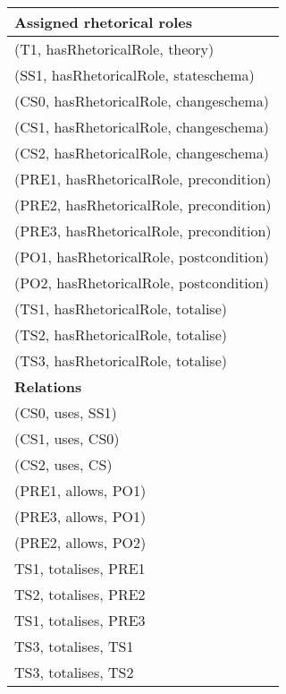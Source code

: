 \documentclass{article}
\begin{document}
\begin{tabular}{|l|}
\hline
\textbf{Assigned rhetorical roles}\\
\hline
(T1, hasRhetoricalRole, theory) \\
(SS1, hasRhetoricalRole, stateschema) \\
(CS0, hasRhetoricalRole, changeschema) \\
(CS1, hasRhetoricalRole, changeschema) \\
(CS2, hasRhetoricalRole, changeschema) \\
(PRE1, hasRhetoricalRole, precondition) \\
(PRE2, hasRhetoricalRole, precondition) \\
(PRE3, hasRhetoricalRole, precondition) \\
(PO1, hasRhetoricalRole, postcondition) \\
(PO2, hasRhetoricalRole, postcondition) \\
(TS1, hasRhetoricalRole, totalise) \\
(TS2, hasRhetoricalRole, totalise) \\
(TS3, hasRhetoricalRole, totalise) \\
\hline
\hline
\textbf{Relations}\\
\hline
(CS0, uses, SS1)\\
(CS1, uses, CS0)\\
(CS2, uses, CS)\\
(PRE1, allows, PO1)\\
(PRE3, allows, PO1)\\
(PRE2, allows, PO2)\\
TS1, totalises, PRE1 \\
TS2, totalises, PRE2 \\
TS1, totalises, PRE3 \\
TS3, totalises, TS1 \\
TS3, totalises, TS2 \\
\hline
\end{tabular}
\end{document}
